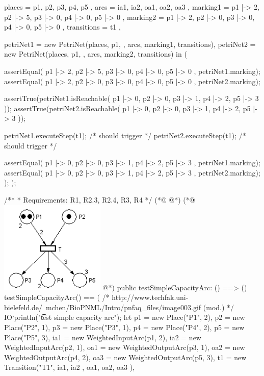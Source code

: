 \begin{vdmpp}
     places = { p1, p2, p3, p4, p5 },
     arcs = { ia1, ia2, oa1, oa2, oa3 },
     marking1 = { p1 |-> 2, p2 |-> 5, p3 |-> 0, p4 |-> 0, p5 |-> 0 },
     marking2 = { p1 |-> 2, p2 |-> 0, p3 |-> 0, p4 |-> 0, p5 |-> 0 },
     transitions = { t1 },

     petriNet1 = new PetriNet(places, p1, {}, arcs, marking1, transitions),
     petriNet2 = new PetriNet(places, p1, {}, arcs, marking2, transitions) in (

      assertEqual({ p1 |-> 2, p2 |-> 5, p3 |-> 0, p4 |-> 0, p5 |-> 0 }, petriNet1.marking);
      assertEqual({ p1 |-> 2, p2 |-> 0, p3 |-> 0, p4 |-> 0, p5 |-> 0 }, petriNet2.marking);

      assertTrue(petriNet1.isReachable({ p1 |-> 0, p2 |-> 0, p3 |-> 1, p4 |-> 2, p5 |-> 3 }));
      assertTrue(petriNet2.isReachable({ p1 |-> 0, p2 |-> 0, p3 |-> 1, p4 |-> 2, p5 |-> 3 }));

      petriNet1.executeStep(t1); /* should trigger */
      petriNet2.executeStep(t1); /* should trigger */

      assertEqual({ p1 |-> 0, p2 |-> 0, p3 |-> 1, p4 |-> 2, p5 |-> 3 }, petriNet1.marking);
      assertEqual({ p1 |-> 0, p2 |-> 0, p3 |-> 1, p4 |-> 2, p5 |-> 3 }, petriNet2.marking);
    );
  );

  /**
   * Requirements: R1, R2.3, R2.4, R3, R4
   */
(*@
\label{testSimpleCapacityArc:260}
@*)
(*@
\includegraphics[width=5cm]{specification/simplecapacityarc.png}
@*)
  public testSimpleCapacityArc: () ==> ()
  testSimpleCapacityArc() == (
    /* http://www.techfak.uni-bielefeld.de/~mchen/BioPNML/Intro/pnfaq_files/image003.gif (mod.) */
    IO`println("\t\t test simple capacity arc");
    let p1 = new Place("P1", 2),
     p2 = new Place("P2", 1),
     p3 = new Place("P3", 1),
     p4 = new Place("P4", 2),
     p5 = new Place("P5", 3),
     ia1 = new WeightedInputArc(p1,  2),
     ia2 = new WeightedInputArc(p2,  1),
     oa1 = new WeightedOutputArc(p3, 1),
     oa2 = new WeightedOutputArc(p4, 2),
     oa3 = new WeightedOutputArc(p5, 3),
     t1 = new Transition("T1", { ia1, ia2 }, { oa1, oa2, oa3 }),


\end{vdmpp}
